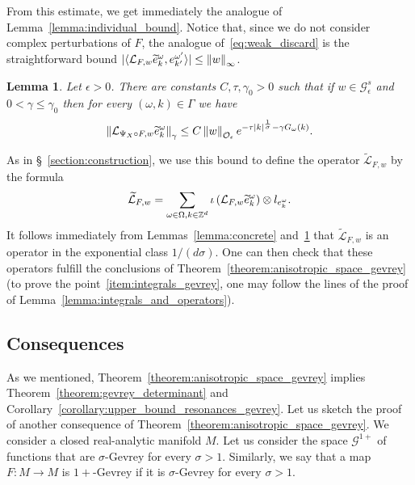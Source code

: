 \documentclass[10pt]{amsart}
\newtheorem{lemm}[theo]{Lemma}\newtheorem{prop}[theo]{Proposition}\newtheorem{coro}[theo]{Corollary}\newtheorem{conj}[theo]{Conjecture}
\theoremstyle{definition}\newtheorem{defi}[theo]{Definition}\newtheorem{rema}[theo]{Remark}\newtheorem{exam}[theo]{Example}\newtheorem{exem}[theo]{Example}\newtheorem{nota}[theo]{Notation}
\newcommand{\n}[1]{\left\|#1\right\|}
\newcommand{\va}[1]{\left|#1\right|}
\newcommand{\brac}[1]{\langle #1 \rangle}
\newcommand{\clO}{\mathcal{O}}
\newcommand{\clL}{\mathcal{L}}
\newcommand{\clG}{\mathcal{G}}
\newcommand{\bbZ}{\mathbb{Z}}
\let\oldtilde\tilde
\renewcommand*{\tilde}[1]{\mathchoice{\widetilde{#1}}{\widetilde{#1}}{\oldtilde{#1}}{\oldtilde{#1}}}
\begin{document}
From this estimate, we get immediately the analogue of Lemma~\ref{lemma:individual_bound}. Notice that, since we do not consider complex perturbations of $F$, the analogue of~\eqref{eq:weak_discard} is the straightforward bound $|\brac{\clL_{F,w} \tilde{e}_{k}^\omega, e_{k'}^{\omega'}}| \leq \n{w}_\infty$.

\begin{lemm}\label{lemma:individual_bound_gevrey}
Let $\epsilon > 0$. There are constants $C,\tau,\gamma_0 > 0$ such that if $w \in \clG_\epsilon^s$ and $0 < \gamma \leq \gamma_0$ then for every $(\omega,k) \in \Gamma$ we have
\begin{equation*}
\n{\clL_{\Psi_X \circ F,w} \tilde{e}_{k}^\omega}_\gamma \leq C \n{w}_{\clO_\epsilon} e^{- \tau \va{k}^{\frac{1}{\sigma}} - \gamma G_\omega(k)}.
\end{equation*}
\end{lemm}

As in \S~\ref{section:construction}, we use this bound to define the operator $\widetilde{\clL}_{F,w}$ by the formula
\begin{equation}\label{eq:def_L_tilde_gevrey}
\widetilde{\clL}_{F,w} = \sum_{\omega \in \Omega, k \in \bbZ^d} \iota\left(\clL_{F,w} \tilde{e}_{k}^\omega\right) \otimes l_{e_k^\omega}.
\end{equation}
It follows immediately from Lemmas~\ref{lemma:concrete} and~\ref{lemma:individual_bound_gevrey} that $\widetilde{\clL}_{F,w}$ is an operator in the exponential class $1/(d \sigma)$. One can then check that these operators fulfill the conclusions of Theorem~\ref{theorem:anisotropic_space_gevrey} (to prove the point~\ref{item:integrals_gevrey}, one may follow the lines of the proof of Lemma~\ref{lemma:integrals_and_operators}).

\subsection{Consequences}

As we mentioned, Theorem~\ref{theorem:anisotropic_space_gevrey} implies Theorem~\ref{theorem:gevrey_determinant} and Corollary~\ref{corollary:upper_bound_resonances_gevrey}. Let us sketch the proof of another consequence of Theorem~\ref{theorem:anisotropic_space_gevrey}. We consider a closed real-analytic manifold $M$. Let us consider the space $\clG^{1+}$ of functions that are $\sigma$-Gevrey for every $\sigma >1$. Similarly, we say that a map $F: M \to M$ is $1+$-Gevrey if it is $\sigma$-Gevrey for every $\sigma > 1$.
\end{document}
